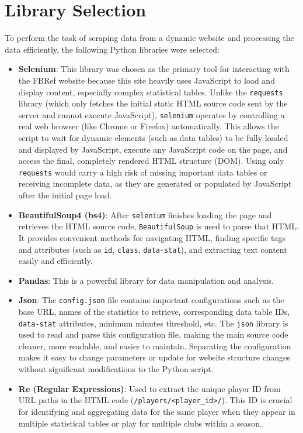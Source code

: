 \documentclass[12pt, a4paper]{report}
\begin{document}
\section{Library Selection}
To perform the task of scraping data from a dynamic website and processing the data efficiently, the following Python libraries were selected:
\begin{itemize}
\renewcommand{\labelitemi}{}
    \item \textbf{Selenium}: This library was chosen as the primary tool for interacting with the FBRef website because this site heavily uses JavaScript to load and display content, especially complex statistical tables. Unlike the \texttt{requests} library (which only fetches the initial static HTML source code sent by the server and cannot execute JavaScript), \texttt{selenium} operates by controlling a real web browser (like Chrome or Firefox) automatically. This allows the script to wait for dynamic elements (such as data tables) to be fully loaded and displayed by JavaScript, execute any JavaScript code on the page, and access the final, completely rendered HTML structure (DOM). Using only \texttt{requests} would carry a high risk of missing important data tables or receiving incomplete data, as they are generated or populated by JavaScript after the initial page load.
    \item \textbf{BeautifulSoup4 (bs4)}: After \texttt{selenium} finishes loading the page and retrieves the HTML source code, \texttt{BeautifulSoup} is used to parse that HTML. It provides convenient methods for navigating HTML, finding specific tags and attributes (such as \texttt{id}, \texttt{class}, \texttt{data-stat}), and extracting text content easily and efficiently.
    \item \textbf{Pandas}: This is a powerful library for data manipulation and analysis.
    \item \textbf{Json}: The \texttt{config.json} file contains important configurations such as the base URL, names of the statistics to retrieve, corresponding data table IDs, \texttt{data-stat} attributes, minimum minutes threshold, etc. The \texttt{json} library is used to read and parse this configuration file, making the main source code cleaner, more readable, and easier to maintain. Separating the configuration makes it easy to change parameters or update for website structure changes without significant modifications to the Python script.
    \item \textbf{Re (Regular Expressions)}: Used to extract the unique player ID from URL paths in the HTML code (\texttt{/players/<player\_id>/}). This ID is crucial for identifying and aggregating data for the same player when they appear in multiple statistical tables or play for multiple clubs within a season.

\end{itemize}
\end{document}
